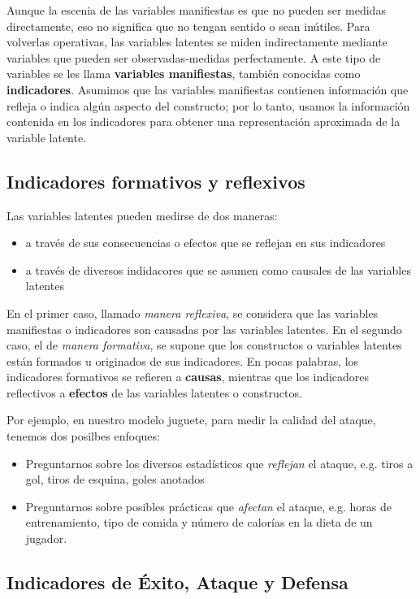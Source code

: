 \documentclass{paper}
\begin{document}
Aunque la escenia de las variables manifiestas es que no pueden ser medidas directamente, eso no significa que no tengan sentido o sean in\'utiles. Para volverlas operativas, las variables latentes se miden indirectamente mediante variables que pueden ser observadas-medidas perfectamente. A este tipo de variables se les llama {\bf variables manifiestas}, tambi\'en conocidas como {\bf indicadores}. Asumimos que las variables manifiestas contienen informaci\'on que refleja o indica alg\'un aspecto del constructo; por lo tanto, usamos la informaci\'on contenida en los indicadores para obtener una representaci\'on aproximada de la variable latente.

\subsection{Indicadores formativos y reflexivos}

Las variables latentes pueden medirse de dos maneras:
\begin{itemize}
  \item a trav\'es de sus consecuencias o efectos que se reflejan en sus indicadores
  \item a trav\'es de diversos indidacores que se asumen como causales de las variables latentes
\end{itemize}

En el primer caso, llamado {\em manera reflexiva}, se considera que las variables manifiestas o indicadores son causadas por las variables latentes. En el segundo caso, el de {\em manera formativa}, se supone que los constructos o variables latentes est\'an formados u originados de sus indicadores.
En pocas palabras, los indicadores formativos se refieren a {\bf causas}, mientras que los indicadores reflectivos a {\bf efectos} de las variables latentes o constructos.

Por ejemplo, en nuestro modelo juguete, para medir la calidad del ataque, tenemos dos posilbes enfoques:
\begin{itemize}
  \item Preguntarnos sobre los diversos estad\'isticos que {\em reflejan} el ataque, e.g. tiros a gol, tiros de esquina, goles anotados
  \item Preguntarnos sobre posibles pr\'acticas que {\em afectan} el ataque, e.g. horas de entrenamiento, tipo de comida y n\'umero de calor\'ias en la dieta de un jugador.
\end{itemize}

\subsection{Indicadores de \'Exito, Ataque y Defensa}
\end{document}
